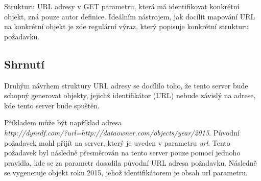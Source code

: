 \documentclass[thesis=B,czech]{FITthesis}[2012/06/26]
\begin{document}
   Strukturu URL adresy v GET parametru, která má identifikovat konkrétní objekt, zná pouze autor definice. Ideálním nástrojem, jak docílit mapování URL na konkrétní
   objekt je zde regulární výraz, který popisuje konkrétní strukturu požadavku.
   
\subsection{Shrnutí}
   Druhým návrhem struktury URL adresy se docílilo toho, že tento server bude schopný generovat objekty, jejichž identifikátor (URL) nebude závislý na adrese, kde tento
   server bude spuštěn.
   
   Příkladem může být například adresa \\ \textit{http://dynrdf.com/?url=http://dataowner.com/objects/year/2015}. Původní požadavek mohl přijít na server, 
   který je uveden v parametru \textit{url}. Tento požadavek byl následně přesměrován na tento server pouze pomocí jednoho pravidla, kde se za parametr dosadila 
   původní URL adresa požadavku. Následně se vygeneruje objekt roku 2015, jehož identifikátorem je obsah url parametru.

   \newpage
   
\end{document}
